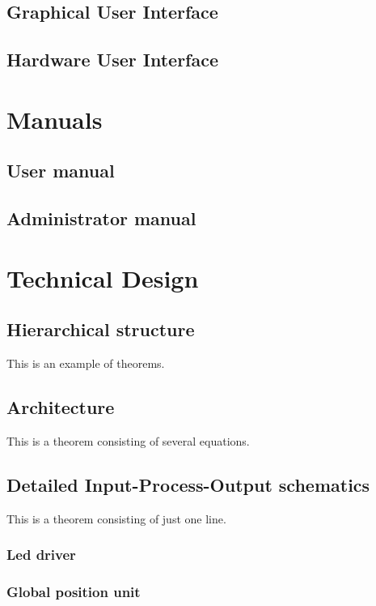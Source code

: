 \documentclass[11pt,fleqn,,a4paper,twoside,openright]{book}
\begin{document}
\section{Graphical User Interface}


\section{Hardware User Interface}

\chapter{Manuals}\label{manuals}

\section{User manual}

\section{Administrator manual}

\chapter{Technical Design}

\section{Hierarchical structure} 

This is an example of theorems.

\section{Architecture} 
This is a theorem consisting of several equations.

\section{Detailed Input-Process-Output schematics} 
This is a theorem consisting of just one line.

\subsection{Led driver}

\subsection{Global position unit}
\end{document}
